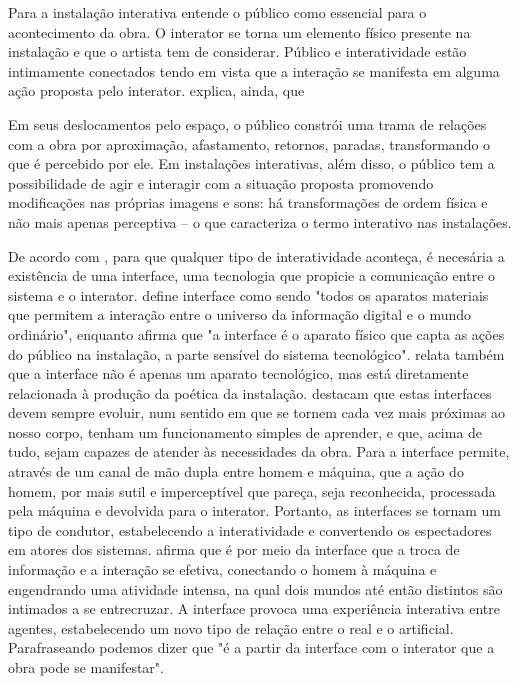 Para  a instalação interativa entende o público como essencial para o acontecimento da obra. O interator se torna um elemento físico presente na instalação e que o artista tem de considerar. Público e interatividade estão intimamente conectados tendo em vista que a interação se manifesta em alguma ação proposta pelo interator.  explica, ainda, que

\begin{citacao}
Em seus deslocamentos pelo espaço, o público constrói uma trama de relações com a obra por aproximação, afastamento, retornos, paradas, transformando o que é percebido por ele. Em instalações interativas, além disso, o público tem a possibilidade de agir e interagir com a situação proposta promovendo modificações nas próprias imagens e sons:  há transformações de ordem física e não mais apenas perceptiva – o que caracteriza o termo interativo nas instalações.  \cite[p. 6]{bochio}  
\end{citacao}

De acordo com , para que qualquer tipo de interatividade aconteça, é necesária a existência de uma interface, uma tecnologia que propicie a comunicação entre o sistema e o interator.  define interface como sendo "todos os aparatos materiais que permitem a interação entre o universo da informação digital e o mundo ordinário", enquanto  afirma que "a interface é o aparato físico que capta as ações do público na instalação, a parte sensível do sistema tecnológico".  relata também que a interface não é apenas um aparato tecnológico, mas está diretamente relacionada à produção da poética da instalação.   destacam que estas interfaces devem sempre evoluir, num sentido em que se tornem cada vez mais próximas ao nosso corpo, tenham um funcionamento simples de aprender, e que, acima de tudo, sejam capazes de atender às necessidades da obra. Para  a interface permite, através de um canal de mão dupla entre homem e máquina, que a ação do homem, por mais sutil e imperceptível que pareça, seja reconhecida, processada pela máquina e devolvida para o interator. Portanto, as interfaces se tornam um tipo de condutor, estabelecendo a interatividade e convertendo os espectadores em atores dos sistemas.  afirma que é por meio da interface que a troca de informação e a interação se efetiva, conectando o homem à máquina e engendrando uma atividade intensa, na qual dois mundos até então distintos são intimados a se entrecruzar. A interface provoca uma experiência interativa entre agentes, estabelecendo um novo tipo de relação entre o real e o artificial. Parafraseando  podemos dizer que "é a partir da interface com o interator que a obra pode se manifestar". 


